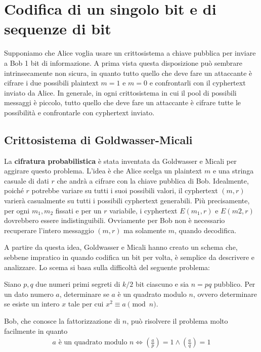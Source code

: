 \setchapterpreamble[u]{\margintoc}
\chapter{Codifica di un singolo bit e di sequenze di bit}

Supponiamo che Alice voglia usare un crittosistema a chiave pubblica per inviare a Bob 1 bit di informazione. A prima vista questa disposizione può sembrare intrinsecamente non sicura, in quanto tutto quello che deve fare un attaccante è cifrare i due possibili plaintext $m = 1$ e $m = 0$ e confrontarli con il cyphertext inviato da Alice. In generale, in ogni crittosistema in cui il pool di possibili messaggi è piccolo, tutto quello che deve fare un attaccante è cifrare tutte le possibilità e confrontarle con cyphertext inviato. 

\section{Crittosistema di Goldwasser-Micali}
La \textbf{cifratura probabilistica} è stata inventata da Goldwasser e Micali per aggirare questo problema. L'idea è che Alice scelga un plaintext $m$ e una stringa casuale di dati $r$ che andrà a cifrare con la chiave pubblica di Bob. Idealmente, poiché $r$ potrebbe variare su tutti i suoi possibili valori, il cyphertext $(m, r)$ varierà casualmente su tutti i possibili cyphertext generabili. Più precisamente, per ogni $m_1, m_2$ fissati e per un $r$ variabile, i cyphertext $E(m_1, r)$ e $E(m2, r)$ dovrebbero essere indistinguibili. Ovviamente per Bob non è necessario recuperare l'intero messaggio $(m, r)$ ma solamente $m$, quando decodifica.

A partire da questa idea, Goldwasser e Micali hanno creato un schema che, sebbene impratico in quando codifica un bit per volta, è semplice da descrivere e analizzare. Lo scema si basa sulla difficoltà del seguente problema:

\begin{definition}
Siano \(p, q\) due numeri primi segreti di $k/2$ bit ciascuno e sia \(n = pq\) pubblico. Per un dato numero \(a\), determinare se \(a\) è un quadrato modulo \(n\), ovvero determinare se esiste un intero \(x\) tale per cui \(x^2 \equiv a \pmod n\).
\end{definition}

\noindent Bob, che conosce la fattorizzazione di $n$, può risolvere il problema molto facilmente in quanto 
\begin{align*}
    a \text{ è un quadrato modulo } n \Longleftrightarrow \left( \frac{a}{p}\right) = 1 \land \left( \frac{a}{q}\right) = 1 
\end{align*}

